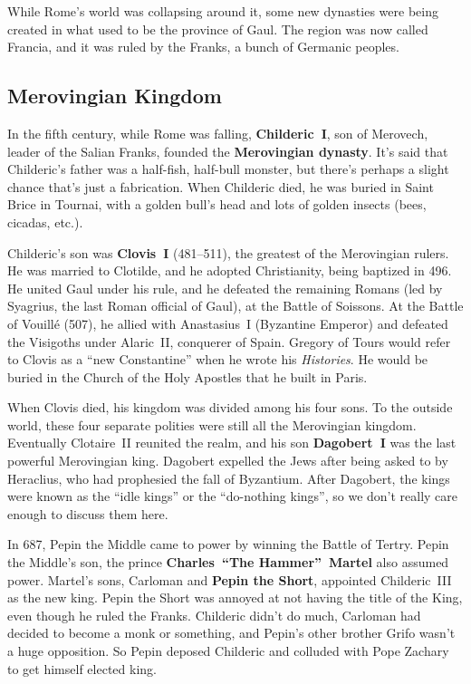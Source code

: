 While Rome's world was collapsing around it,
some new dynasties were being created in what used to be the province of Gaul.
The region was now called Francia, and it was ruled by the Franks, a bunch of Germanic peoples.

\subsection*{Merovingian Kingdom}

In the fifth century, while Rome was falling,
\textbf{Childeric~I}, son of Merovech, leader of the Salian Franks, founded the \textbf{Merovingian dynasty}.
It's said that Childeric's father was a half-fish, half-bull monster,
but there's perhaps a slight chance that's just a fabrication.
When Childeric died, he was buried in Saint Brice in Tournai,
with a golden bull's head and lots of golden insects (bees, cicadas, etc.).

Childeric's son was \textbf{Clovis~I} (481--511), the greatest of the Merovingian rulers.
He was married to Clotilde, and he adopted Christianity, being baptized in 496.
He united Gaul under his rule, and he defeated the remaining Romans
(led by Syagrius, the last Roman official of Gaul),
at the Battle of Soissons.
At the Battle of Vouill\'e (507), he allied with Anastasius~I (Byzantine Emperor)
and defeated the Visigoths under Alaric~II, conquerer of Spain.
Gregory of Tours would refer to Clovis as a ``new Constantine'' when he wrote his \textit{Histories}.
He would be buried in the Church of the Holy Apostles that he built in Paris.

When Clovis died, his kingdom was divided among his four sons.
To the outside world, these four separate polities were still all the Merovingian kingdom.
Eventually Clotaire~II reunited the realm, and his son \textbf{Dagobert~I} was the last powerful Merovingian king.
Dagobert expelled the Jews after being asked to by Heraclius, who had prophesied the fall of Byzantium.
After Dagobert, the kings were known as the ``idle kings'' or the ``do-nothing kings'',
so we don't really care enough to discuss them here.

In 687, Pepin the Middle came to power by winning the Battle of Tertry.
Pepin the Middle's son, the prince \textbf{Charles~``The Hammer''~Martel} also assumed power.
Martel's sons, Carloman and \textbf{Pepin the Short}, appointed Childeric~III as the new king.
Pepin the Short was annoyed at not having the title of the King, even though he ruled the Franks.
Childeric didn't do much, Carloman had decided to become a monk or something,
and Pepin's other brother Grifo wasn't a huge opposition.
So Pepin deposed Childeric and colluded with Pope Zachary to get himself elected king.

